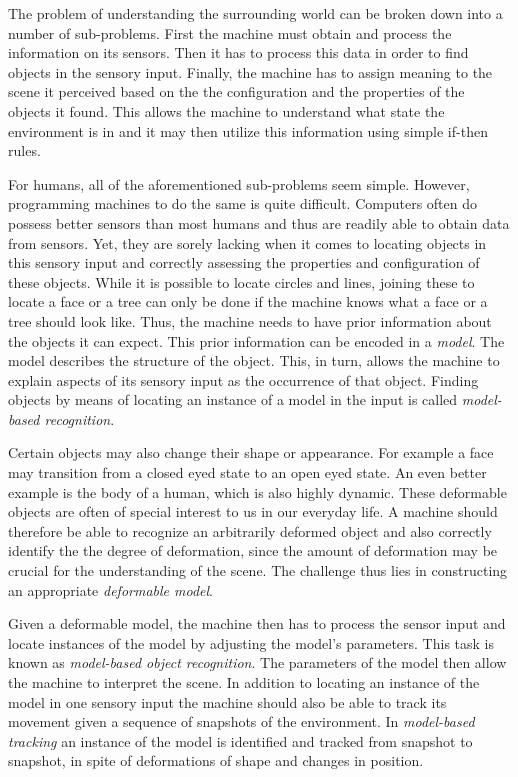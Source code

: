 \documentclass[11pt,a4paper]{report}
\begin{document}
The problem of understanding the surrounding world can be broken down into a
number of sub-problems. First the machine must obtain and process the information on
its sensors. Then it has to process this data in order to find objects in the
sensory input. Finally, the machine has to assign meaning to the scene it perceived
based on the the configuration and the properties of the objects it found. This
allows the machine to understand what state the environment is in and it may
then utilize this information using simple if-then rules.

For humans, all of the aforementioned sub-problems seem simple. However, programming
machines to do the same is quite difficult. Computers often do
possess better sensors than most humans and thus are readily able to obtain data
from sensors. Yet, they are sorely lacking when it comes to locating objects
in this sensory input and correctly assessing the properties and configuration
of these objects. While it is possible to locate circles and lines, joining
these to locate a face or a tree can only be done if the machine knows what a
face or a tree should look like. Thus, the machine needs to have prior
information about the objects it can expect. This prior information can be
encoded in a \textit{model}. The model describes the structure of the object.
This, in turn, allows the machine to explain aspects of its sensory input as the
occurrence of that object. Finding objects by means of locating an instance of a
model in the input is called \textit{model-based recognition}.

Certain objects may also change their shape or
appearance. For example a face may transition from a closed eyed state to an
open eyed state. An even better example is the body of a human, which is also
highly dynamic. These deformable objects are often of special interest to us in
our everyday life. A machine should therefore be able to recognize an arbitrarily deformed
object and also correctly identify the the degree of deformation, since the amount of deformation may be crucial for the understanding of
the scene. The challenge thus lies in constructing an appropriate \textit{deformable
model}. 

Given a deformable model, the machine then has to process the sensor input and
locate instances of the model by adjusting the model's parameters. This task is
known as \textit{model-based object recognition}. The parameters of the model then allow the
machine to interpret the scene. In addition to locating an instance of the model
in one sensory input the machine should also be able to track its movement given a sequence of snapshots of
the environment. In \textit{model-based tracking} an instance of the model is
identified and tracked from snapshot to snapshot, in spite of deformations of shape
and changes in position.
\end{document}
